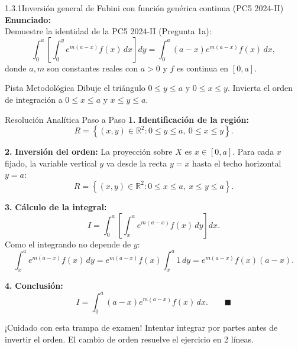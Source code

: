 \documentclass[11pt,a4paper]{article}
\begin{document}
\begin{nivelbox}{1.3.1}{Inversión general de Fubini con función genérica continua (PC5 2024-II)}
\textbf{Enunciado:}\\
Demuestre la identidad de la PC5 2024-II (Pregunta 1a):
\[\int_0^a \left[ \int_0^y e^{m(a-x)} f(x) \, dx \right] dy = \int_0^a (a - x) e^{m(a-x)} f(x) \, dx,\]
donde $a, m$ son constantes reales con $a > 0$ y $f$ es continua en $[0, a]$.

\begin{observacionbox}{Pista Metodológica}
Dibuje el triángulo $0 \le y \le a$ y $0 \le x \le y$. Invierta el orden de integración a $0 \le x \le a$ y $x \le y \le a$.
\end{observacionbox}

\begin{ejerciciobox}{Resolución Analítica Paso a Paso}
\smallskip\noindent\textbf{1.} \textbf{Identificación de la región:}
\[R = \left\{ (x,y) \in \mathbb{R}^2 : 0 \le y \le a, \ 0 \le x \le y \right\}.\]

\smallskip\noindent\textbf{2.} \textbf{Inversión del orden:}
La proyección sobre $X$ es $x \in [0, a]$. Para cada $x$ fijado, la variable vertical $y$ va desde la recta $y = x$ hasta el techo horizontal $y = a$:
\[R = \left\{ (x,y) \in \mathbb{R}^2 : 0 \le x \le a, \ x \le y \le a \right\}.\]

\smallskip\noindent\textbf{3.} \textbf{Cálculo de la integral:}
\[I = \int_0^a \left[ \int_x^a e^{m(a-x)} f(x) \, dy \right] dx.\]
Como el integrando no depende de $y$:
\[\int_x^a e^{m(a-x)} f(x) \, dy = e^{m(a-x)} f(x) \int_x^a 1 \, dy = e^{m(a-x)} f(x) (a - x).\]

\smallskip\noindent\textbf{4.} \textbf{Conclusión:}
\[I = \int_0^a (a - x) e^{m(a-x)} f(x) \, dx. \qquad \blacksquare\]
\end{ejerciciobox}

\begin{errorbox}{¡Cuidado con esta trampa de examen!}
Intentar integrar por partes antes de invertir el orden. El cambio de orden resuelve el ejercicio en 2 líneas.
\end{errorbox}
\end{nivelbox}
\bigskip
\end{document}

